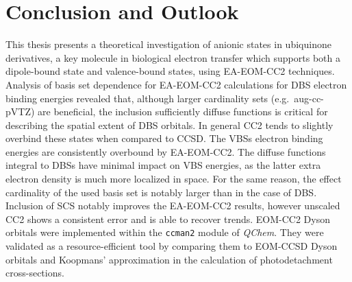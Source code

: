 \chapter{Conclusion and Outlook}\label{ch:conclusion}
This thesis presents a theoretical investigation of anionic states in ubiquinone derivatives, a key molecule in biological electron transfer which supports both a dipole-bound state and valence-bound states, using EA-EOM-CC2 techniques.\\

Analysis of basis set dependence for EA-EOM-CC2 calculations for DBS electron binding energies revealed that, although larger cardinality sets (e.g.\ aug-cc-pVTZ) are beneficial, the inclusion sufficiently diffuse functions is critical for describing the spatial extent of DBS orbitals. In general CC2 tends to slightly overbind these states when compared to CCSD. 
The VBSs electron binding energies are consistently overbound by EA-EOM-CC2. The diffuse functions integral to DBSs have minimal impact on VBS energies, as the latter extra electron density is much more localized in space. For the same reason, the effect cardinality of the used basis set is notably larger than in the case of DBS. Inclusion of SCS notably improves the EA-EOM-CC2 results, however unscaled CC2 shows a consistent error and is able to recover trends.
EOM-CC2 Dyson orbitals were implemented within the \texttt{ccman2} module of \textit{QChem}. They were validated as a resource-efficient tool by comparing them to EOM-CCSD Dyson orbitals and Koopmans' approximation in the calculation of photodetachment cross-sections.\\

